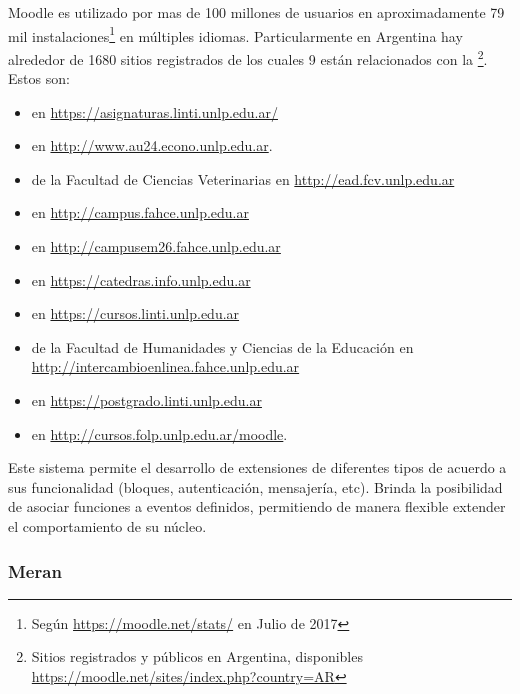 Moodle es utilizado por mas de 100 millones de usuarios en aproximadamente 79 mil instalaciones\footnote{Según \url{https://moodle.net/stats/} en Julio de 2017} en múltiples idiomas. Particularmente en Argentina hay alrededor de 1680 sitios registrados de los cuales 9 están relacionados con la \unlp\footnote{Sitios registrados y públicos en Argentina, disponibles \url{https://moodle.net/sites/index.php?country=AR}}. Estos son:
\begin{itemize}
\item {} en \url{https://asignaturas.linti.unlp.edu.ar/}
\item {} en \url{http://www.au24.econo.unlp.edu.ar}.
\item {} de la Facultad de Ciencias Veterinarias en  \url{http://ead.fcv.unlp.edu.ar}
\item {} en \url{http://campus.fahce.unlp.edu.ar}
\item {} en \url{http://campusem26.fahce.unlp.edu.ar}
\item {} en \url{https://catedras.info.unlp.edu.ar}
\item {} en \url{https://cursos.linti.unlp.edu.ar}
\item {} de la Facultad de Humanidades y Ciencias de la Educación en \url{http://intercambioenlinea.fahce.unlp.edu.ar}
\item {} en \url{https://postgrado.linti.unlp.edu.ar}
\item {} en \url{http://cursos.folp.unlp.edu.ar/moodle}.
\end{itemize}

Este sistema permite el desarrollo de extensiones de diferentes tipos de acuerdo a sus funcionalidad (bloques, autenticación, mensajería, etc). Brinda la posibilidad de asociar funciones a eventos definidos, permitiendo de manera flexible extender el comportamiento de su núcleo.




\subsubsection{Meran}
\label{merans}